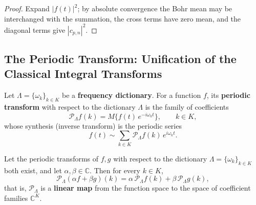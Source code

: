 \begin{proof}
Expand $|f(t)|^2$; by absolute convergence the Bohr mean may be interchanged with the summation, the cross terms have zero mean, and the diagonal terms give $|c_{p,n}|^2$.
\end{proof}

\subsection{\texorpdfstring{The Periodic Transform: Unification of the Classical Integral Transforms}{The Periodic Transform}}

\begin{definition}\label{def:periodic_transform}
Let $\Lambda = \{\omega_k\}_{k \in K}$ be a \textbf{frequency dictionary}. For a function $f$, its \textbf{periodic transform} with respect to the dictionary $\Lambda$ is the family of coefficients
\[
\mathcal{P}_\Lambda f(k) = M\big\{ f(t)\, e^{-i\omega_k t} \big\}, \qquad k \in K,
\]
whose synthesis (inverse transform) is the periodic series
\[
f(t) \sim \sum_{k \in K} \mathcal{P}_\Lambda f(k)\, e^{i\omega_k t}.
\]
\end{definition}

\begin{proposition}\label{prop:periodic_transform_linear}
Let the periodic transforms of $f, g$ with respect to the dictionary $\Lambda = \{\omega_k\}_{k \in K}$ both exist, and let $\alpha, \beta \in \mathbb{C}$. Then for every $k \in K$,
\[
\mathcal{P}_\Lambda(\alpha f + \beta g)(k) = \alpha\, \mathcal{P}_\Lambda f(k) + \beta\, \mathcal{P}_\Lambda g(k),
\]
that is, $\mathcal{P}_\Lambda$ is a \textbf{linear map} from the function space to the space of coefficient families $\mathbb{C}^K$.
\end{proposition}

